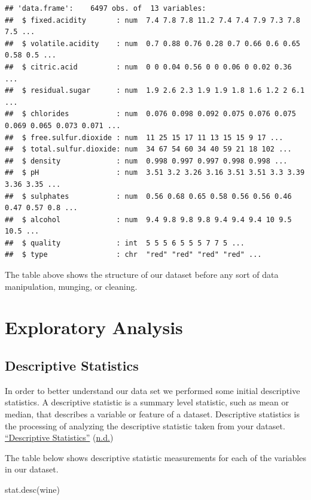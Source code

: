 \documentclass[
]{book}
\newenvironment{Shaded}{\begin{snugshade}}{\end{snugshade}}
\newcommand{\FunctionTok}[1]{\textcolor[rgb]{0.00,0.00,0.00}{#1}}
\newcommand{\NormalTok}[1]{#1}
\begin{document}
\begin{verbatim}
## 'data.frame':    6497 obs. of  13 variables:
##  $ fixed.acidity       : num  7.4 7.8 7.8 11.2 7.4 7.4 7.9 7.3 7.8 7.5 ...
##  $ volatile.acidity    : num  0.7 0.88 0.76 0.28 0.7 0.66 0.6 0.65 0.58 0.5 ...
##  $ citric.acid         : num  0 0 0.04 0.56 0 0 0.06 0 0.02 0.36 ...
##  $ residual.sugar      : num  1.9 2.6 2.3 1.9 1.9 1.8 1.6 1.2 2 6.1 ...
##  $ chlorides           : num  0.076 0.098 0.092 0.075 0.076 0.075 0.069 0.065 0.073 0.071 ...
##  $ free.sulfur.dioxide : num  11 25 15 17 11 13 15 15 9 17 ...
##  $ total.sulfur.dioxide: num  34 67 54 60 34 40 59 21 18 102 ...
##  $ density             : num  0.998 0.997 0.997 0.998 0.998 ...
##  $ pH                  : num  3.51 3.2 3.26 3.16 3.51 3.51 3.3 3.39 3.36 3.35 ...
##  $ sulphates           : num  0.56 0.68 0.65 0.58 0.56 0.56 0.46 0.47 0.57 0.8 ...
##  $ alcohol             : num  9.4 9.8 9.8 9.8 9.4 9.4 9.4 10 9.5 10.5 ...
##  $ quality             : int  5 5 5 6 5 5 5 7 7 5 ...
##  $ type                : chr  "red" "red" "red" "red" ...
\end{verbatim}

The table above shows the structure of our dataset before any sort of data manipulation, munging, or cleaning.

\hypertarget{exploratory-analysis}{%
\section{Exploratory Analysis}\label{exploratory-analysis}}

\hypertarget{descriptive-statistics-1}{%
\subsection{Descriptive Statistics}\label{descriptive-statistics-1}}

In order to better understand our data set we performed some initial descriptive statistics. A descriptive statistic is a summary level statistic, such as mean or median, that describes a variable or feature of a dataset. Descriptive statistics is the processing of analyzing the descriptive statistic taken from your dataset. \protect\hyperlink{ref-descrip_stat}{{``Descriptive Statistics''}} (\protect\hyperlink{ref-descrip_stat}{n.d.})

The table below shows descriptive statistic measurements for each of the variables in our dataset.

\begin{Shaded}
\begin{Highlighting}[]
\FunctionTok{stat.desc}\NormalTok{(wine)}
\end{Highlighting}
\end{Shaded}
\end{document}
